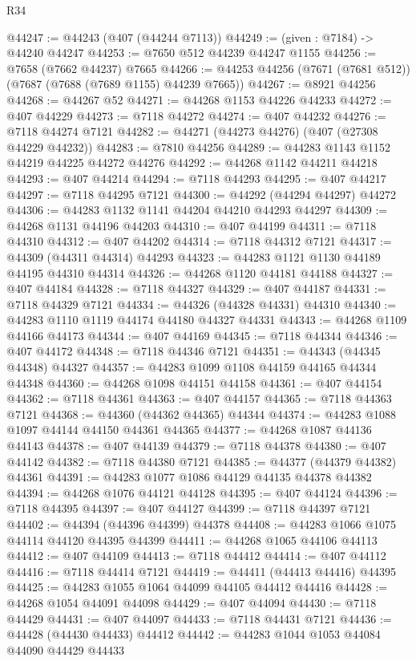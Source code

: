 \begin{lexlean}{R34}
\begin{coremodule}
@44247 := @44243 (@407 (@44244 @7113))
@44249 := (given : @7184) -> @44240 @44247
@44253 := @7650 @512 @44239 @44247 @1155
@44256 := @7658 (@7662 @44237) @7665
@44266 := @44253 @44256 (@7671 (@7681 @512)) (@7687 (@7688 (@7689 @1155) @44239 @7665))
@44267 := @8921 @44256
@44268 := @44267 @52
@44271 := @44268 @1153 @44226 @44233
@44272 := @407 @44229
@44273 := @7118 @44272
@44274 := @407 @44232
@44276 := @7118 @44274 @7121
@44282 := @44271 (@44273 @44276) (@407 (@27308 @44229 @44232))
@44283 := @7810 @44256
@44289 := @44283 @1143 @1152 @44219 @44225 @44272 @44276
@44292 := @44268 @1142 @44211 @44218
@44293 := @407 @44214
@44294 := @7118 @44293
@44295 := @407 @44217
@44297 := @7118 @44295 @7121
@44300 := @44292 (@44294 @44297) @44272
@44306 := @44283 @1132 @1141 @44204 @44210 @44293 @44297
@44309 := @44268 @1131 @44196 @44203
@44310 := @407 @44199
@44311 := @7118 @44310
@44312 := @407 @44202
@44314 := @7118 @44312 @7121
@44317 := @44309 (@44311 @44314) @44293
@44323 := @44283 @1121 @1130 @44189 @44195 @44310 @44314
@44326 := @44268 @1120 @44181 @44188
@44327 := @407 @44184
@44328 := @7118 @44327
@44329 := @407 @44187
@44331 := @7118 @44329 @7121
@44334 := @44326 (@44328 @44331) @44310
@44340 := @44283 @1110 @1119 @44174 @44180 @44327 @44331
@44343 := @44268 @1109 @44166 @44173
@44344 := @407 @44169
@44345 := @7118 @44344
@44346 := @407 @44172
@44348 := @7118 @44346 @7121
@44351 := @44343 (@44345 @44348) @44327
@44357 := @44283 @1099 @1108 @44159 @44165 @44344 @44348
@44360 := @44268 @1098 @44151 @44158
@44361 := @407 @44154
@44362 := @7118 @44361
@44363 := @407 @44157
@44365 := @7118 @44363 @7121
@44368 := @44360 (@44362 @44365) @44344
@44374 := @44283 @1088 @1097 @44144 @44150 @44361 @44365
@44377 := @44268 @1087 @44136 @44143
@44378 := @407 @44139
@44379 := @7118 @44378
@44380 := @407 @44142
@44382 := @7118 @44380 @7121
@44385 := @44377 (@44379 @44382) @44361
@44391 := @44283 @1077 @1086 @44129 @44135 @44378 @44382
@44394 := @44268 @1076 @44121 @44128
@44395 := @407 @44124
@44396 := @7118 @44395
@44397 := @407 @44127
@44399 := @7118 @44397 @7121
@44402 := @44394 (@44396 @44399) @44378
@44408 := @44283 @1066 @1075 @44114 @44120 @44395 @44399
@44411 := @44268 @1065 @44106 @44113
@44412 := @407 @44109
@44413 := @7118 @44412
@44414 := @407 @44112
@44416 := @7118 @44414 @7121
@44419 := @44411 (@44413 @44416) @44395
@44425 := @44283 @1055 @1064 @44099 @44105 @44412 @44416
@44428 := @44268 @1054 @44091 @44098
@44429 := @407 @44094
@44430 := @7118 @44429
@44431 := @407 @44097
@44433 := @7118 @44431 @7121
@44436 := @44428 (@44430 @44433) @44412
@44442 := @44283 @1044 @1053 @44084 @44090 @44429 @44433

\end{coremodule}
\end{lexlean}
